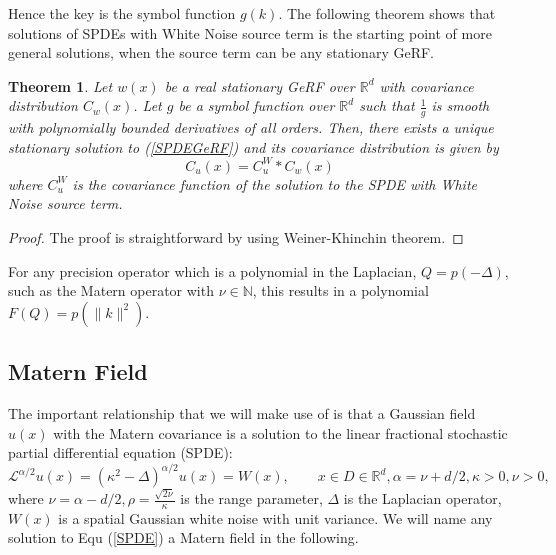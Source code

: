 \documentclass{article}
\newtheorem{theorem}{Theorem}
\begin{document}

Hence the key is the symbol function $g(k)$.
The following theorem shows that solutions of SPDEs with White Noise source term is the starting point of more general solutions, when the source term can be any stationary GeRF.
\begin{theorem}\label{uniquenessandexistence}
	Let $w(x)$ be a real stationary GeRF over $\mathbb{R}^d$ with covariance distribution $C_w(x)$. 
	Let $g$ be a symbol function over $\mathbb{R}^d$ such that $\frac{1}{g}$ is smooth with polynomially bounded derivatives of all orders. 
	Then, there exists a unique stationary solution to (\ref{SPDEGeRF}) and its covariance distribution is given by
\begin{equation}
	C_u(x) = C_u^W * C_w(x)
\end{equation}
where $C_u^W$ is the covariance function of the solution to the SPDE with White Noise source term.
\end{theorem}
\begin{proof}
	The proof is straightforward by using Weiner-Khinchin theorem.
\end{proof}
For any precision operator which is a polynomial in the Laplacian, $Q = p(-\Delta)$, such as the Matern operator with $\nu \in \mathbb{N}$, 
this results in a polynomial $F(Q) = p(\|k\|^2)$.
\subsection{Matern Field}
The important relationship that we will make use of is that a Gaussian field $u(x)$ with the Matern covariance is 
a solution to the linear fractional stochastic partial differential equation (SPDE):
\begin{equation}\label{SPDE}
	\mathcal{L}^{\alpha/2}u(x) = (\kappa^2 - \Delta)^{\alpha/2} u(x) = W(x), \qquad x\in D\in \mathbb{R}^d, \alpha=\nu + d/2, \kappa>0, \nu>0,
\end{equation}
where $\nu = \alpha - d/2, \rho = \frac{\sqrt{2\nu}}{\kappa}$ is the range parameter, $\Delta$ is the Laplacian operator, $W(x)$ is a spatial Gaussian white noise with unit variance.
We will name any solution to Equ (\ref{SPDE}) a Matern field in the following. 
\end{document}
